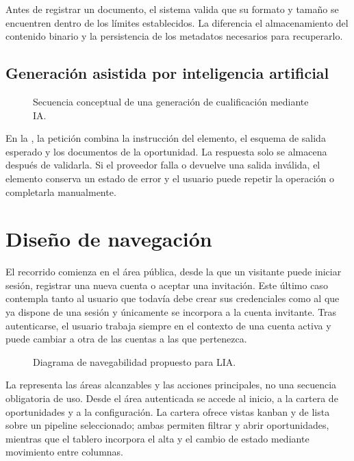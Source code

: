 Antes de registrar un documento, el sistema valida que su formato y tamaño se
encuentren dentro de los límites establecidos. La
 diferencia el almacenamiento del contenido
binario y la persistencia de los metadatos necesarios para recuperarlo.

\subsection{Generación asistida por inteligencia artificial}

\begin{figure}[H]
  \centering
  \resizebox{\textwidth}{!}{
    
  }
  \caption{Secuencia conceptual de una generación de cualificación mediante IA.}
  \label{fig:sequence-ai-qualification}
\end{figure}

En la , la petición combina la instrucción
del elemento, el esquema de salida esperado y los documentos de la
oportunidad. La respuesta solo se almacena después de validarla. Si el proveedor
falla o devuelve una salida inválida, el elemento conserva un estado de error y
el usuario puede repetir la operación o completarla manualmente.

\section{Diseño de navegación}

El recorrido comienza en el área pública, desde la que un visitante puede
iniciar sesión, registrar una nueva cuenta o aceptar una invitación. Este último
caso contempla tanto al usuario que todavía debe crear sus credenciales como al
que ya dispone de una sesión y únicamente se incorpora a la cuenta invitante.
Tras autenticarse, el usuario trabaja siempre en el contexto de una cuenta
activa y puede cambiar a otra de las cuentas a las que pertenezca.

\begin{figure}[H]
  \centering
  \resizebox{\textwidth}{!}{
    
  }
  \caption{Diagrama de navegabilidad propuesto para LIA.}
  \label{fig:navigation-map}
\end{figure}

La  representa las áreas alcanzables y las acciones
principales, no una secuencia obligatoria de uso. Desde el área autenticada se
accede al inicio, a la cartera de oportunidades y a la configuración. La
cartera ofrece vistas kanban y de lista sobre un pipeline seleccionado; ambas
permiten filtrar y abrir oportunidades, mientras que el tablero incorpora el
alta y el cambio de estado mediante movimiento entre columnas.

